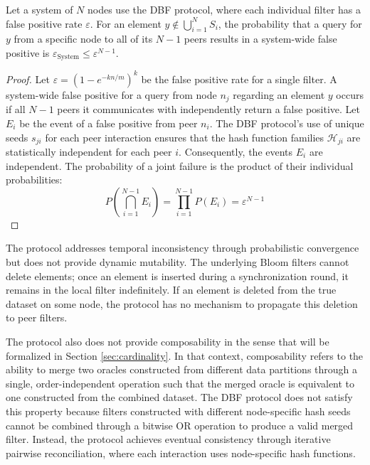 \begin{proposition}
    Let a system of $N$ nodes use the DBF protocol, where each individual filter has a false positive rate $\varepsilon$. For an element $y \notin \bigcup_{i=1}^N S_i$, the probability that a query for $y$ from a specific node to all of its $N-1$ peers results in a system-wide false positive is $\varepsilon_{\text{System}} \leq \varepsilon^{N-1}$.
\end{proposition}
\begin{proof}
    Let $\varepsilon = (1 - e^{-kn/m})^k$ be the false positive rate for a single filter. A system-wide false positive for a query from node $n_j$ regarding an element $y$ occurs if all $N-1$ peers it communicates with independently return a false positive. Let $E_i$ be the event of a false positive from peer $n_i$. The DBF protocol's use of unique seeds $s_{ji}$ for each peer interaction ensures that the hash function families $\mathcal{H}_{ji}$ are statistically independent for each peer $i$. Consequently, the events $E_i$ are independent. The probability of a joint failure is the product of their individual probabilities:
    $$P(\bigcap_{i=1}^{N-1} E_i) = \prod_{i=1}^{N-1} P(E_i) = \varepsilon^{N-1}$$
\end{proof}

The protocol addresses temporal inconsistency through probabilistic convergence but does not provide dynamic mutability. The underlying Bloom filters cannot delete elements; once an element is inserted during a synchronization round, it remains in the local filter indefinitely. If an element is deleted from the true dataset on some node, the protocol has no mechanism to propagate this deletion to peer filters.

The protocol also does not provide composability in the sense that will be formalized in Section \ref{sec:cardinality}. In that context, composability refers to the ability to merge two oracles constructed from different data partitions through a single, order-independent operation such that the merged oracle is equivalent to one constructed from the combined dataset. The DBF protocol does not satisfy this property because filters constructed with different node-specific hash seeds cannot be combined through a bitwise OR operation to produce a valid merged filter. Instead, the protocol achieves eventual consistency through iterative pairwise reconciliation, where each interaction uses node-specific hash functions.
